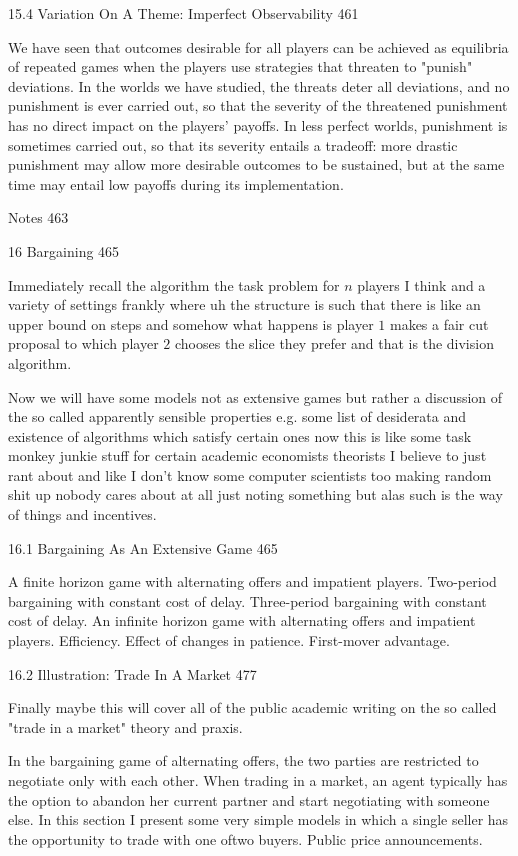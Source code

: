15.4 Variation On A Theme: Imperfect Observability 461

We have seen that outcomes desirable for all players can be achieved as equilibria of repeated games when the players use strategies that threaten to "punish" deviations. In the worlds we have studied, the threats deter all deviations, and no punishment is ever carried out, so that the severity of the threatened punishment has no direct impact on the players' payoffs. In less perfect worlds, punishment is sometimes carried out, so that its severity entails a tradeoff: more drastic punishment may allow more desirable outcomes to be sustained, but at the same time may entail low payoffs during its implementation.

Notes 463



16 Bargaining 465

Immediately recall the algorithm the task problem for $n$ players I think and a variety of settings frankly where uh the structure is such that there is like an upper bound on steps and somehow what happens is player $1$ makes a fair cut proposal to which player $2$ chooses the slice they prefer and that is the division algorithm.

Now we will have some models not as extensive games but rather a discussion of the so called apparently sensible properties e.g. some list of desiderata and existence of algorithms which satisfy certain ones now this is like some task monkey junkie stuff for certain academic economists theorists I believe to just rant about and like I don't know some computer scientists too making random shit up nobody cares about at all just noting something but alas such is the way of things and incentives.

16.1 Bargaining As An Extensive Game 465

A finite horizon game with alternating offers and impatient players. Two-period bargaining with constant cost of delay. Three-period bargaining with constant cost of delay. An infinite horizon game with alternating offers and impatient players. Efficiency. Effect of changes in patience. First-mover advantage.

16.2 Illustration: Trade In A Market 477

Finally maybe this will cover all of the public academic writing on the so called "trade in a market" theory and praxis.

In the bargaining game of alternating offers, the two parties are restricted to negotiate only with each other. When trading in a market, an agent typically has the option to abandon her current partner and start negotiating with someone else. In this section I present some very simple models in which a single seller has the opportunity to trade with one oftwo buyers. Public price announcements.

